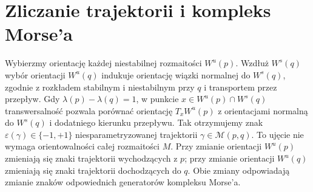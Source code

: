 \section{Zliczanie trajektorii i kompleks Morse'a}
Wybierzmy orientację każdej niestabilnej rozmaitości $W^u(p)$.
Wzdłuż $W^s(q)$ wybór orientacji $W^u(q)$ indukuje orientację wiązki
normalnej do $W^s(q)$, zgodnie z rozkładem stabilnym i niestabilnym
przy $q$ i transportem przez przepływ. Gdy $\lambda(p)-\lambda(q)=1$,
w punkcie $x\in W^u(p)\cap W^s(q)$ transwersalność pozwala porównać
orientację $T_xW^u(p)$ z orientacjami normalną do $W^s(q)$
i dodatniego kierunku przepływu. Tak otrzymujemy znak
$\varepsilon(\gamma)\in\{-1,+1\}$ niesparametryzowanej
trajektorii $\gamma\in\mathcal M(p,q)$. To ujęcie nie wymaga
orientowalności całej rozmaitości $M$. Przy zmianie orientacji
$W^u(p)$ zmieniają się znaki trajektorii wychodzących z $p$;
przy zmianie orientacji $W^u(q)$ zmieniają się znaki trajektorii
dochodzących do $q$. Obie zmiany odpowiadają zmianie znaków
odpowiednich generatorów kompleksu Morse'a.

